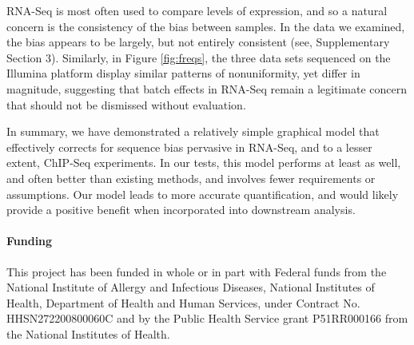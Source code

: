 \documentclass{bioinfo}
\begin{document}
RNA-Seq is most often used to compare levels of expression, and so a natural
concern is the consistency of the bias between samples. In the data we examined,
the bias appears to be largely, but not entirely consistent (see, Supplementary
Section 3).  Similarly, in Figure \ref{fig:freqs}, the three data sets sequenced
on the Illumina platform display similar patterns of nonuniformity, yet differ
in magnitude, suggesting that batch effects in RNA-Seq remain a legitimate
concern that should not be dismissed without evaluation.

In summary, we have demonstrated a relatively simple graphical model that
effectively corrects for sequence bias pervasive in RNA-Seq, and to a lesser
extent, ChIP-Seq experiments. In our tests, this model performs at least as
well, and often better than existing methods, and involves fewer requirements or
assumptions. Our model leads to more accurate quantification, and would likely
provide a positive benefit when incorporated into downstream analysis.



\paragraph{Funding\textcolon} This project has been funded in whole or in part
with Federal funds from the National Institute of Allergy and Infectious
Diseases, National Institutes of Health, Department of Health and Human Services,
under Contract No.  HHSN272200800060C and by the Public Health Service grant
P51RR000166 from the National Institutes of Health.





\end{document}
